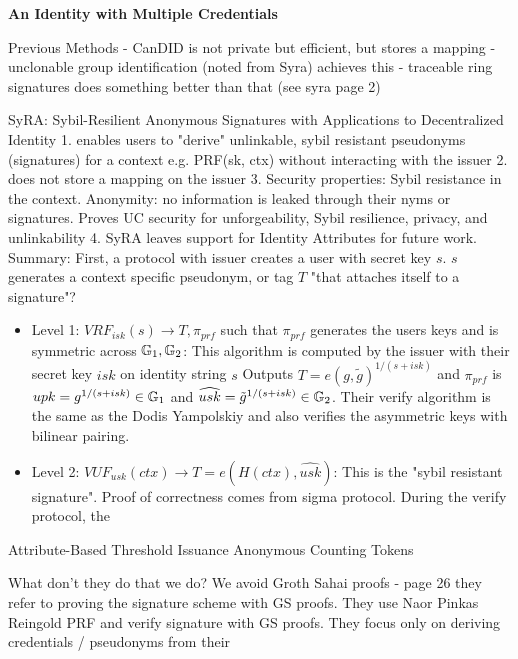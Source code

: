 \noindent \textbf{An Identity with Multiple Credentials}

Previous Methods
- CanDID is not private but efficient, but stores a mapping
- unclonable group identification (noted from Syra) achieves this
- traceable ring signatures does something better than that (see syra page 2)

\noindent SyRA: Sybil-Resilient Anonymous Signatures  with Applications to Decentralized Identity \cite{crites_syra_2024}
1. enables users to "derive" unlinkable, sybil resistant pseudonyms (signatures) for a context e.g. PRF(sk, ctx) without interacting with the issuer
2. does not store a mapping on the issuer
3. Security properties: Sybil resistance in the context. Anonymity: no information is leaked through their nyms or signatures. Proves UC security for unforgeability, Sybil resilience, privacy, and unlinkability
4. SyRA leaves support for Identity Attributes for future work.
Summary: First, a protocol with issuer creates a user with secret key $s$. $s$ generates a context specific pseudonym, or tag $T$ "that attaches itself to a signature"?

\begin{itemize}
    \item Level 1: $VRF_{isk}(s) \to T, \pi_{prf}$ such that $\pi_{prf}$ generates the users keys and is symmetric across $\mathbb{G}_1, \mathbb{G}_2$: This algorithm is computed by the issuer with their secret key $isk$ on identity string $s$ Outputs $T = e(g, \tilde{g})^{1/(s + isk)}$ and $\pi_{prf}$ is $upk = g^{1/(s + isk)} \in \mathbb{G}_1$ and $\widehat{usk} = \tilde{g}^{1/(s + isk)} \in \mathbb{G}_2$. Their verify algorithm is the same as the Dodis Yampolskiy and also verifies the asymmetric keys with bilinear pairing.
    \item Level 2: $VUF_{usk}(ctx) \to T = e(H(ctx), \widehat{usk})$: This is the "sybil resistant signature". Proof of correctness comes from sigma protocol. During the verify protocol, the 
\end{itemize}





Attribute-Based Threshold Issuance Anonymous Counting Tokens \cite{rabaninejad_attribute-based_nodate}


What don't they do that we do?
We avoid Groth Sahai proofs - page 26 they refer to proving the signature scheme with GS proofs. 
They use Naor Pinkas Reingold PRF and verify signature with GS proofs. 
They focus only on deriving credentials / pseudonyms from their


